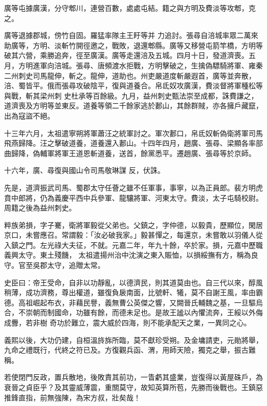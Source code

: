 \begin{pinyinscope}
 廣等屯據廣漢，分守郫川，連營百數，處處屯結。籍之與方明及費淡等攻郫，克之。



 廣等退據郡城，傍竹自固。羅猛率隊主王盱等并
 力追討。張尋自涪城率眾二萬來助廣等，方明、淡斬竹開徑邀之，戰敗，退還郫縣。廣等又移營屯箭竿橋，方明等破其六營，乘勝追奔，徑至廣漢。廣等走還涪及五城。四月十日，發道濟喪。五月，方明進軍向涪城。張尋、唐頻渡水拒戰，方明擊破之，生擒偽驃騎將軍、雍秦二州刺史司馬龍伸，斬之。龍伸，道助也。州吏嚴道度斬嚴遐首，廣等並奔散，涪、蜀皆平。俄而張尋攻破陰平，復與道養合。帛氐奴攻廣漢，費淡督將軍種松等與戰，斬其梁州刺
 史杜承等百餘級。九月，益州刺史甄法崇至成都，誅費謙之，道濟喪及方明等並東反。道養等領二千餘家逃於郪山，其餘群賊，亦各擁戶藏竄，出為寇盜不絕。



 十三年六月，太祖遣寧朔將軍蕭汪之統軍討之。軍次郪口，帛氐奴斬偽衛將軍司馬飛燕歸降。汪之擊破道養，道養還入郪山。十四年四月，趙廣、張尋、梁顯各率部曲歸降，偽輔軍將軍王道恩斬道養，送首，餘黨悉平。遷趙廣、張尋等於京師。



 十六年，廣、尋復與國山令司馬敬琳謀
 反，伏誅。



 先是，道濟振武司馬、蜀郡太守任薈之雖不任軍事，事寧，以為正員郎。裴方明虎賁中郎將，仍為義慶平西中兵參軍、龍驤將軍、河東太守。費淡，太子屯騎校尉。周籍之後為益州刺史。



 粹族弟損，字子騫，衛將軍毅從父弟也。父鎮之，字仲德，以毅貴，歷顯位，閑居京口，未嘗應召。常謂毅：「汝必破我家。」毅甚憚之，每還京，未嘗敢以羽儀人從入鎮之門。左光祿大夫征，不就。元嘉二年，年九十餘，卒於家。損，元嘉中歷職義興太守。東土殘饑，
 太祖遣揚州治中沈演之東入賑恤，以損綏撫有方，稱為良守。官至吳郡太守，追贈太常。



 史臣曰：帝王受命，自非以功靜亂，以德濟民，則其道莫由也。自三代以來，醇風稍薄，成功濟務，尊出權道，雖復負扆南面，比號軒、犧，莫不自謝王風，率由霸德。高祖崛起布衣，非藉民譽，義無曹公英傑之響，又闕晉氏輔魏之基，一旦驅烏合，不崇朝而制國命，功雖有餘，而德未足也。是故王謐以內懼流奔，王綏以外侮成釁，若非樹
 奇功於難立，震大威於四海，則不能承配天之業，一異同之心。



 義熙以後，大功仍建，自桓溫旍旆所臨，莫不獻珍受朔。及金墉請吏，元勛將舉，九命之禮既行，代終之符已及。方復觀兵函、渭，用師天險，獨克之舉，振古難稱。



 若使閉門反政，置兵散地，後敗責其前功，一眚虧其盛業，豈復得以黃屋硃戶，為衰晉之貞臣乎？及其靈威薄震，重關莫守，故知英算所苞，先勝而後戰也。王鎮惡推鋒直指，前無強陳，為宋方叔，壯矣哉！



\end{pinyinscope}